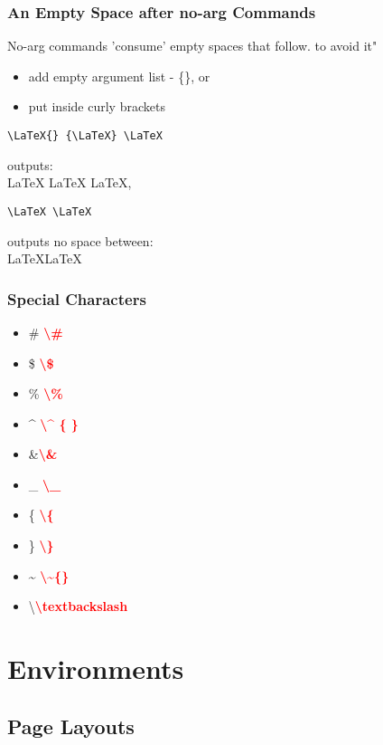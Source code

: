 \documentclass{report}
\begin{document}
\section{An Empty Space after no-arg Commands}
No-arg commands 'consume' empty spaces that follow. to avoid it"
\begin{itemize}
	\item add empty argument list - \{\}, or
	\item put inside curly brackets
\end{itemize} 
\begin{verbatim}
\LaTeX{} {\LaTeX} \LaTeX
\end{verbatim}
outputs:\\
\LaTeX{} {\LaTeX} \LaTeX,
\begin{verbatim}
\LaTeX \LaTeX
\end{verbatim}
outputs no space between:\\
\LaTeX \LaTeX

\section{Special Characters}
\begin{itemize}
	\item  \#{}  \tab \textcolor{red}{\textbf{\textbackslash \#}}
	\item \${} \tab \textbf{\textcolor{red}{ \textbackslash \$}}
	\item \%{} \tab \textbf{\textcolor{red}{\textbackslash \%}}
	\item \^{} \tab \textcolor{red}{\textbf{\textbackslash \^{} \{ \}}}
	\item \&{}\tab \textbf{\textcolor{red}{\textbackslash \&}}
	\item \_{} \tab \textbf{\textcolor{red}{\textbackslash \_}}
	\item \{{} \tab \textbf{\textcolor{red}{\textbackslash \{}}
	\item \}{} \tab \textbf{\textcolor{red}{\textbackslash \}}}
	\item  \~{} \tab \textbf{\textcolor{red}{\textbackslash \~{}\{{}\}{}}} 
	\item \textbackslash \tab \textbf{\textcolor{red}{\textbackslash textbackslash}}
\end{itemize}

\part{Environments}
\chapter{Page Layouts}
\end{document}
